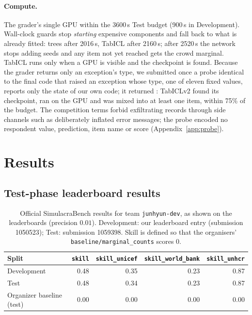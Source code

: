 \documentclass{article}
\newcommand{\teamid}{\texttt{junhyun-dev}}
\begin{document}
\paragraph{Compute.} The grader's single GPU within the 3600\,s Test budget
(900\,s in Development). Wall-clock guards stop \emph{starting} expensive
components and fall back to what is already fitted: trees after 2016\,s, TabICL
after 2160\,s; after 2520\,s the network stops adding seeds and any item not yet
reached gets the crowd marginal. TabICL runs only when a GPU is visible and the
checkpoint is found. Because the grader returns only an exception's type, we
submitted once a probe identical to the final code that raised an exception
whose type, one of eleven fixed values, reports only the state of our own code;
it returned \texttt{\ProbeType}: TabICLv2 found its checkpoint, ran on the GPU
and was mixed into at least one item, within 75\% of the budget. The competition
terms forbid exfiltrating records through side channels such as deliberately
inflated error messages; the probe encoded no respondent value, prediction,
item name or score (Appendix~\ref{app:probe}).

\section{Results}
\label{sec:results}

\subsection{Test-phase leaderboard results}

\begin{table}[H]
  \centering
  \small
  \caption{Official SimulacraBench results for team \teamid, as shown on the
  leaderboards (precision $0.01$). Development: our leaderboard entry
  (submission 1050523); Test: submission 1059398. Skill is defined so that the
  organisers' \texttt{baseline/marginal\_counts} scores $0$.}
  \label{tab:results}
  \begin{tabular}{lrrrr}
    \toprule
    Split & \texttt{skill} & \texttt{skill\_unicef} & \texttt{skill\_world\_bank} & \texttt{skill\_unhcr} \\
    \midrule
    Development & 0.48 & 0.35 & 0.23 & 0.87 \\
    Test        & 0.48 & 0.34 & 0.23 & 0.87 \\
    Organizer baseline (test) & 0.00 & 0.00 & 0.00 & 0.00 \\
    \bottomrule
  \end{tabular}
\end{table}
\end{document}
